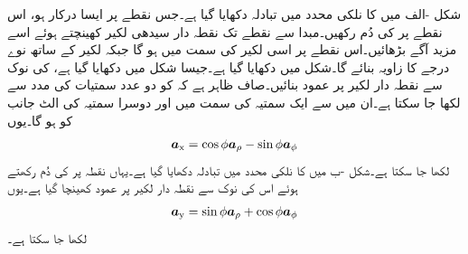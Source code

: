 شکل -الف میں  کا نلکی محدد میں تبادلہ دکھایا گیا ہے۔جس نقطے پر ایسا درکار ہو، اس نقطے پر  کی دُم رکھیں۔مبدا سے نقطے تک نقطہ دار سیدھی لکیر کھینچتے ہوئے اسے مزید آگے بڑھائیں۔اس نقطے پر  اسی لکیر کی سمت میں ہو گا جبکہ  لکیر کے ساتھ نوے درجے کا زاویہ بنائے گا۔شکل میں  دکھایا گیا ہے۔جیسا شکل میں دکھایا گیا ہے،  کی نوک سے نقطہ دار لکیر پر عمود بنائیں۔صاف ظاہر ہے کہ  کو دو عدد سمتیات کی مدد سے لکھا جا سکتا ہے۔ان میں سے ایک سمتیہ  کی سمت میں اور دوسرا سمتیہ  کی الٹ جانب کو ہو گا۔یوں
\begin{align}\label{مساوات_سمتیہ_اکائی_ایکس_نلکی_میں}
{\boldsymbol{a}}_{\textup{x}}=\cos \phi {\boldsymbol{a}}_{\rho}-\sin \phi {\boldsymbol{a}}_{\phi}
\end{align}
لکھا جا سکتا ہے۔شکل -ب میں  کا نلکی محدد میں تبادلہ دکھایا گیا ہے۔یہاں نقطہ پر  کی دُم رکھتے ہوئے اس کی نوک سے نقطہ دار لکیر پر عمود کھینچا گیا ہے۔یوں
\begin{align}\label{مساوات_سمتیہ_اکائی_وائے_نلکی_میں}
{\boldsymbol{a}}_{\textup{y}}=\sin \phi {\boldsymbol{a}}_{\rho}+\cos \phi {\boldsymbol{a}}_{\phi}
\end{align}
لکھا جا سکتا ہے۔


